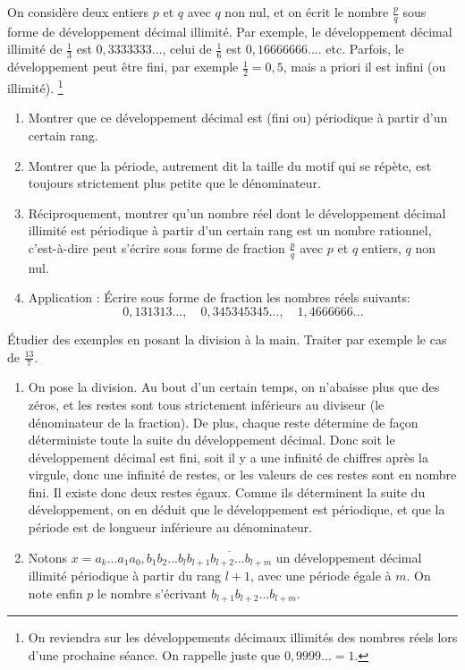 \begin{exo}
On considère deux entiers $p$ et $q$ avec $q$ non nul, et on écrit le nombre $\frac{p}{q}$ sous forme de \og développement décimal illimité\fg. Par exemple, le développement décimal illimité de $\frac13$ est $0,3333333...$, celui de  $\frac16$ est $0,16666666....$ etc. Parfois, le développement peut être fini, par exemple $\frac12 = 0,5$, mais a priori il est infini (ou \og illimité\fg).
\footnote{On reviendra sur les développements décimaux illimités des nombres réels lors d'une prochaine séance. On rappelle juste que $0,9999... = 1$.}
\begin{enumerate}
\item Montrer que ce développement décimal est (fini ou) périodique à partir d'un certain rang.

\item Montrer que la période, autrement dit la taille du motif qui se répète, est toujours strictement plus petite que le dénominateur.

\item Réciproquement, montrer qu'un nombre réel dont le développement décimal illimité est périodique à partir d'un certain rang est un nombre rationnel, c'est-à-dire peut s'écrire sous forme de fraction $\frac{p}{q}$ avec $p$ et $q$ entiers, $q$ non nul.

\item Application : \'Ecrire sous forme de fraction les nombres réels suivants:
\[0,131313...,\quad 0,345345345...,\quad 1,4666666...
\]
\end{enumerate}
\begin{hint}
\'Etudier des exemples en posant la division à la main. Traiter par exemple le cas de $\frac{13}{7}$.
\end{hint}
\begin{sol}
\begin{enumerate}
\item On pose la division. Au bout d'un certain temps, on n'abaisse plus que des zéros, et les restes sont tous strictement inférieurs au diviseur (le dénominateur de la fraction). De plus, chaque reste détermine de façon déterministe toute la suite du développement décimal. Donc soit le développement décimal est fini, soit il y a une infinité de chiffres après la virgule, donc une infinité de restes, or les valeurs de ces restes sont en nombre fini. Il existe donc deux restes égaux. Comme ils déterminent la suite du développement, on en déduit que le développement est périodique, et que la période est de longueur inférieure au dénominateur.
\item Notons $x=a_k...a_1a_0,b_1b_2...b_l\overline{b_{l+1}b_{l+2}...b_{l+m}}$ un développement décimal illimité périodique à partir du rang $l+1$, avec une période égale à $m$. On note enfin $p$ le nombre s'écrivant $b_{l+1}b_{l+2}...b_{l+m}$.  


\end{enumerate}
\end{sol}
\end{exo}
